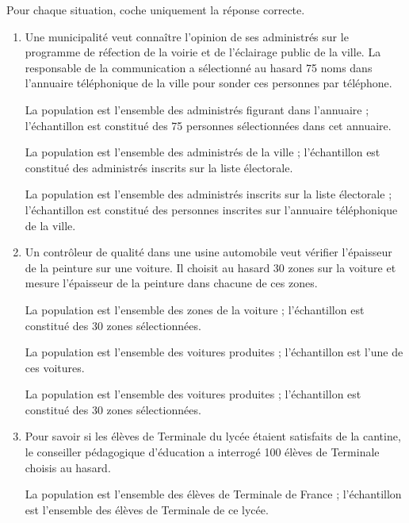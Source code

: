 \documentclass[main.tex]{subfiles}
\begin{document}
\newpage
\begin{exercise}[points=4]
    Pour chaque situation, coche uniquement la réponse correcte.
    \begin{enumerate}
        \item Une municipalité veut connaître l'opinion de ses administrés sur le programme de réfection de la voirie et de l'éclairage public de la ville. La responsable de la communication a sélectionné au hasard 75 noms dans l'annuaire téléphonique de la ville pour sonder ces personnes par téléphone.
              \begin{QCM}
                  \choice La population est l'ensemble des administrés figurant dans l'annuaire ; l'échantillon est constitué des 75 personnes sélectionnées dans cet annuaire.

                  \choice La population est l'ensemble des administrés de la ville ; l'échantillon est constitué des administrés inscrits sur la liste électorale.

                  \choice La population est l'ensemble des administrés inscrits sur la liste électorale ; l'échantillon est constitué des personnes inscrites sur l'annuaire téléphonique de la ville.
              \end{QCM}
        \item Un contrôleur de qualité dans une usine automobile veut vérifier l'épaisseur de la peinture sur une voiture. Il choisit au hasard 30 zones sur la voiture et mesure l'épaisseur de la peinture dans chacune de ces zones.
              \begin{QCM}
                  \choice La population est l'ensemble des zones de la voiture ; l'échantillon est constitué des 30 zones sélectionnées.

                  \choice La population est l'ensemble des voitures produites ; l'échantillon est l'une de ces voitures.

                  \choice La population est l'ensemble des voitures produites ; l'échantillon est constitué des 30 zones sélectionnées.
              \end{QCM}
        \item Pour savoir si les élèves de Terminale du lycée étaient satisfaits de la cantine, le conseiller pédagogique d'éducation a interrogé 100 élèves de Terminale choisis au hasard.
              \begin{QCM}
                  \choice La population est l'ensemble des élèves de Terminale de France ; l'échantillon est l'ensemble des élèves de Terminale de ce lycée.


\end{QCM}
\end{enumerate}
\end{exercise}
\end{document}
